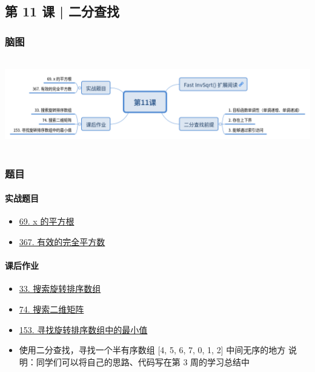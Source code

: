 \subsection{第 11 课 | 二分查找}

\subsubsection{脑图}

\includegraphics[width=140mm,height=40mm]{images/camp/第11课.png}

\subsubsection{题目}

\paragraph{实战题目}

\begin{itemize}
  \item \hyperref[leetcode:69]{69. x 的平方根}
  \item \hyperref[leetcode:367]{367. 有效的完全平方数}
\end{itemize}

\paragraph{课后作业}

\begin{itemize}
  \item \hyperref[leetcode:33]{33. 搜索旋转排序数组}
  \item \hyperref[leetcode:74]{74. 搜索二维矩阵}
  \item \hyperref[leetcode:153]{153. 寻找旋转排序数组中的最小值}
  \item 使用二分查找，寻找一个半有序数组 [4, 5, 6, 7, 0, 1, 2] 中间无序的地方
    说明：同学们可以将自己的思路、代码写在第 3 周的学习总结中
\end{itemize}
